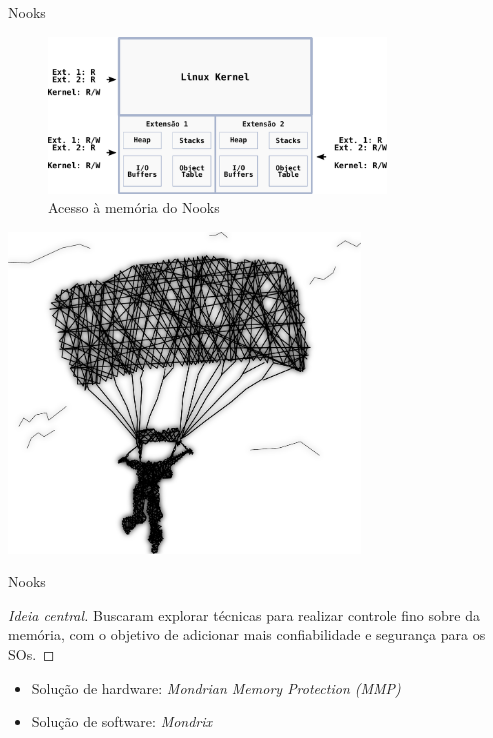 \documentclass[xcolor={usenames,svgnames,dvipsnames},brazil,english,12pt,aspectratio=149]{beamer}
\begin{document}
\begin{frame}{Nooks}
  \begin{figure}[!h]
    \centering
    \includegraphics[width=0.8\textwidth]{nooks_mem}
    \caption[Acesso à memória do Nooks]{Acesso à memória do Nooks}
    \label{fig:nooks_mem}
  \end{figure}
\end{frame}

\begin{frame}[plain]
  \includegraphics[width=0.7\textwidth]{presentation_cap2_six}
\end{frame}

\begin{frame}{Nooks}

  \begin{proof}[Ideia central]
Buscaram explorar técnicas para realizar controle fino sobre da memória, com o
objetivo de adicionar mais confiabilidade e segurança para os SOs.
  \end{proof}

  \begin{itemize}
    \item Solução de hardware: \emph{Mondrian Memory Protection (MMP)}
    \item Solução de software: \emph{Mondrix}
  \end{itemize}

\end{frame}
\end{document}
